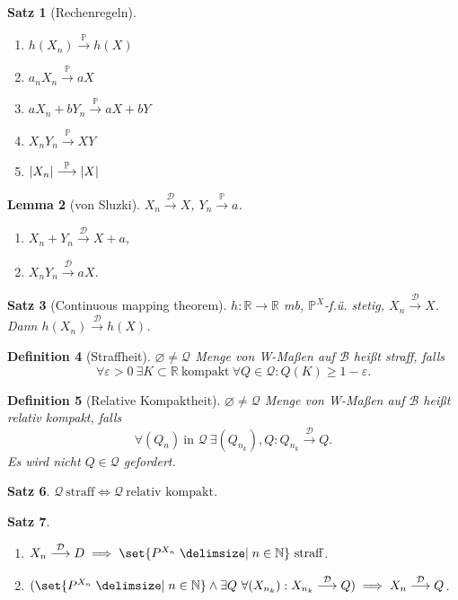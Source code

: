 \documentclass[a4paper,8pt]{article}
\newcounter{Sec}
\theoremstyle{nonumberbreak}
\newtheorem{definition}{Definition}[Sec]
\newtheorem{satz}[definition]{Satz}
\newtheorem{lemma}[definition]{Lemma}
\renewcommand{\P}{\mathbb{P}}
\newcommand{\R}{\mathbb{R}}
\newcommand{\N}{\mathbb{N}}
\newcommand{\sk}{\mathrel{\stackrel{\P}{\longrightarrow}}}
\newcommand{\vk}{\mathrel{\stackrel{\mathcal{D}}{\longrightarrow}}}
\begin{document}
\begin{multicols}{3}
\begin{satz}[Rechenregeln]
		{\setlength{\columnseprule}{0pt}\begin{multicols}{2}
		\begin{enumerate}[label=(\alph*)]
			\item $h(X_n)\sk h(X)$
			\item $a_nX_n\sk aX$
			\item $aX_n+bY_n\sk aX+bY$
			\item $X_nY_n\sk XY$
			\item $\abs{X_n}\sk\abs{X}$
		\end{enumerate}
		\end{multicols}}
	\end{satz}
	\begin{lemma}[von Sluzki]
		$X_n\vk X$, $Y_n\sk a$.
		{\setlength{\columnseprule}{0pt}\begin{multicols}{2}
		\begin{enumerate}[label=(\alph*)]
			\item $X_n+Y_n\vk X+a$,
			\item $X_nY_n\vk aX$.
		\end{enumerate}
		\end{multicols}}
	\end{lemma}
	\begin{satz}[Continuous mapping theorem]
		$h\colon\R\to\R$ mb, $\P^X$-f.ü. stetig, $X_n\vk X$. Dann $h(X_n)\vk h(X)$.
	\end{satz}
	\begin{definition}[Straffheit]
		$\varnothing\neq\mathcal{Q}$ Menge von W-Maßen auf $\mathcal{B}$ heißt straff, falls
		\[\forall\varepsilon>0~\exists K\subset\R~\text{kompakt}~\forall Q\in\mathcal{Q}:Q(K)\geq 1-\varepsilon.\]
	\end{definition}
	\begin{definition}[Relative Kompaktheit]
		$\varnothing\neq\mathcal{Q}$ Menge von W-Maßen auf $\mathcal{B}$ heißt relativ kompakt, falls
		\[\forall (Q_n)~\text{in $\mathcal{Q}$}~\exists (Q_{n_k}), Q: Q_{n_k}\vk Q.\]
		Es wird \textit{nicht} $Q\in\mathcal{Q}$ gefordert.
	\end{definition}
	\begin{satz}
		$\mathcal{Q}~\text{straff}\iff\mathcal{Q}~\text{relativ kompakt}$.
	\end{satz}
	\begin{satz}
		\begin{enumerate}[label=(\alph*)]
			\item $X_n\vk D\implies\set{P^{X_n}\given n\in\N}~\text{straff}$.
			\item $(\set{P^{X_n}\given n\in\N}\wedge \exists Q~\forall (X_{n_k}): X_{n_k}\vk Q)\implies X_n\vk Q$.

\end{enumerate}
\end{satz}
\end{multicols}
\end{document}
